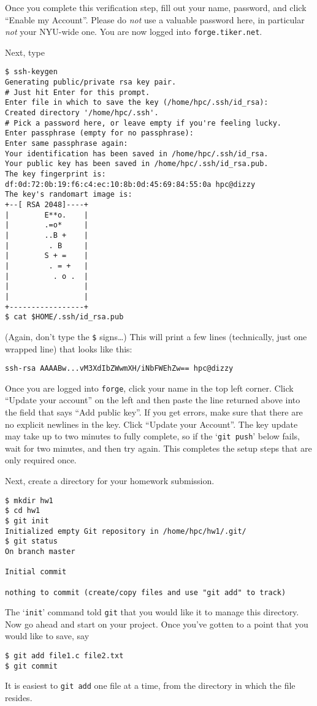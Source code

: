 \documentclass[11pt]{article}
\begin{document}
Once you complete this
verification step, fill out your name, password, and click ``Enable my
Account''. Please do \emph{not} use a valuable password here, in
particular \emph{not} your NYU-wide one. You are now logged into
\texttt{forge.tiker.net}.

Next, type
\begin{lstlisting}
$ ssh-keygen
Generating public/private rsa key pair.
# Just hit Enter for this prompt.
Enter file in which to save the key (/home/hpc/.ssh/id_rsa): 
Created directory '/home/hpc/.ssh'.
# Pick a password here, or leave empty if you're feeling lucky.
Enter passphrase (empty for no passphrase): 
Enter same passphrase again: 
Your identification has been saved in /home/hpc/.ssh/id_rsa.
Your public key has been saved in /home/hpc/.ssh/id_rsa.pub.
The key fingerprint is:
df:0d:72:0b:19:f6:c4:ec:10:8b:0d:45:69:84:55:0a hpc@dizzy
The key's randomart image is:
+--[ RSA 2048]----+
|        E**o.    |
|        .=o*     |
|        ..B +    |
|         . B     |
|        S + =    |
|         . = +   |
|          . o .  |
|                 |
|                 |
+-----------------+
$ cat $HOME/.ssh/id_rsa.pub
\end{lstlisting}
(Again, don't type the \verb|$| signs\dots)
This will print a few lines (technically, just one wrapped line) that
looks like this:
\begin{lstlisting}
ssh-rsa AAAABw...vM3XdIbZWwmXH/iNbFWEhZw== hpc@dizzy
\end{lstlisting}
Once you are logged into \texttt{forge}, click your name in the top
left corner. Click ``Update your account'' on the left and then paste
the line returned above into the field that says ``Add public key''.
If you get errors, make sure that there are no explicit newlines in the key.
Click ``Update your Account''. The key update may take up to two
minutes to fully complete, so if the `\texttt{git push}' below fails,
wait for two minutes, and then try again.
This completes the setup steps that are only required once.

Next, create a directory for your homework submission.
\begin{lstlisting}
$ mkdir hw1
$ cd hw1
$ git init
Initialized empty Git repository in /home/hpc/hw1/.git/
$ git status
On branch master

Initial commit

nothing to commit (create/copy files and use "git add" to track)
\end{lstlisting}
The `\texttt{init}' command told \texttt{git} that you would like it to
manage this directory. Now go ahead and start on your project.
Once you've gotten to a point that you would like to save, say
\begin{lstlisting}
$ git add file1.c file2.txt
$ git commit
\end{lstlisting}
It is easiest to \texttt{git add} one file at a time, from the
directory in which the file resides.
\end{document}
